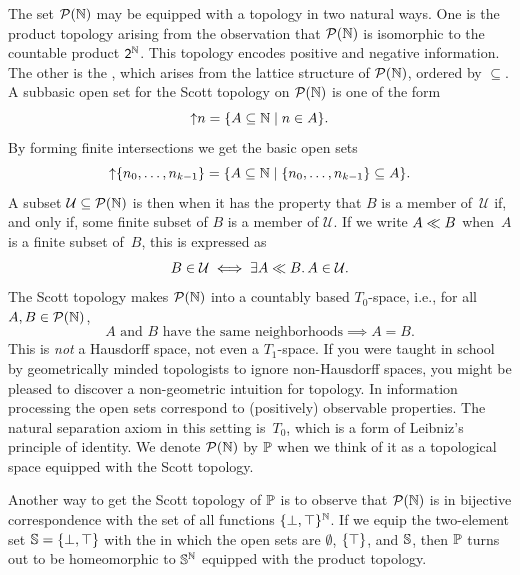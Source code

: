 The set $\mathcal{P}(\mathbb{N})$ may be equipped with a topology in two natural
ways. One is the product topology arising from the observation that
$\mathcal{P}(\mathbb{N})$ is isomorphic to the countable product $\mathsf{2}^{\mathbb{N}}$. This
topology encodes positive and negative information. The other is the
, which arises from the lattice structure of
$\mathcal{P}(\mathbb{N})$, ordered by $\subseteq$. A subbasic open set for the Scott
topology on $\mathcal{P}(\mathbb{N})$ is one of the form
%
\begin{equation*}
  {\uparrow}n = \{A \subseteq \mathbb{N} \mid n \in A\}.
\end{equation*}
%
By forming finite intersections we get the basic open sets
%
\begin{equation*}
  {\uparrow}\{n_0, \ldots, n_{k-1}\} =
  \{A \subseteq \mathbb{N} \mid \{n_0, \ldots, n_{k-1}\} \subseteq A\}.
\end{equation*}
%
A subset $\mathcal{U} \subseteq \mathcal{P}(\mathbb{N})$ is then 
when it has the property that $B$ is a member of~$\mathcal{U}$ if, and
only if, some finite subset of $B$ is a member of $\mathcal{U}$. If we
write $A \ll B$ when~$A$ is a finite subset of~$B$, this is
expressed as
%
\begin{equation*}
  B \in \mathcal{U} \iff \exists A \ll B .\, A \in \mathcal{U}.
\end{equation*}
%
The Scott topology makes $\mathcal{P}(\mathbb{N})$ into a countably based
$T_0$-space, i.e., for all $A, B \in \mathcal{P}(\mathbb{N})$,
%
\begin{equation*}
  \text{$A$ and $B$ have the same neighborhoods} \implies A = B.
\end{equation*}
%
This is \emph{not} a Hausdorff space, not even a $T_1$-space. If you
were taught in school by geometrically minded topologists to ignore
non-Hausdorff spaces, you might be pleased to discover a non-geometric
intuition for topology. In information processing the open sets
correspond to (positively) observable properties. The natural
separation axiom in this setting is~$T_0$, which is a form of
Leibniz's principle of identity. We
denote $\mathcal{P}(\mathbb{N})$ by $\mathbb{P}$ when we think of it as a topological
space equipped with the Scott topology.

Another way to get the Scott topology of $\mathbb{P}$ is to observe that
$\mathcal{P}(\mathbb{N})$ is in bijective correspondence with the set of all
functions $\{\bot, \top\}^{\mathbb{N}}$. If we equip the two-element set
$\mathbb{S} = \{\bot, \top\}$ with the  in
which the open sets are $\emptyset$, $\{\top\}$, and $\mathbb{S}$, then
$\mathbb{P}$ turns out to be homeomorphic to $\mathbb{S}^{\mathbb{N}}$ equipped with
the product topology.


